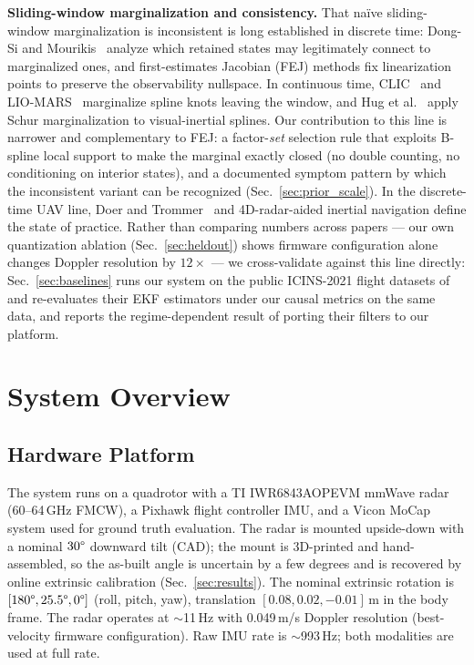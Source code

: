 \documentclass[conference]{IEEEtran}
\begin{document}
\textbf{Sliding-window marginalization and consistency.}
That na\"ive sliding-window marginalization is inconsistent is long
established in discrete time: Dong-Si and
Mourikis~\cite{dongsi2012consistency} analyze which retained states
may legitimately connect to marginalized ones, and first-estimates
Jacobian (FEJ) methods fix linearization points to preserve the
observability nullspace.  In continuous time,
CLIC~\cite{lv2023clic} and
LIO-MARS~\cite{quenzel2025liomars} marginalize spline knots leaving
the window, and Hug et al.~\cite{hug2022continuous} apply Schur
marginalization to visual-inertial splines.  Our contribution to this
line is narrower and complementary to FEJ: a factor-\emph{set}
selection rule that exploits B-spline local support to make the
marginal exactly closed (no double counting, no conditioning on
interior states), and a documented symptom pattern by which the
inconsistent variant can be recognized (Sec.~\ref{sec:prior_scale}).
In the discrete-time UAV line, Doer and
Trommer~\cite{doer2020ekf} and 4D-radar-aided inertial
navigation define the state of practice.
Rather than comparing numbers across papers --- our own quantization
ablation (Sec.~\ref{sec:heldout}) shows firmware configuration alone
changes Doppler resolution by $12\times$ --- we cross-validate against
this line directly: Sec.~\ref{sec:baselines} runs our system on the
public ICINS-2021 flight datasets of~\cite{doer2021yrio} and re-evaluates
their EKF estimators under our causal metrics on the same data, and
reports the regime-dependent result of porting their filters to our
platform.

\section{System Overview}
\label{sec:overview}

\subsection{Hardware Platform}
The system runs on a quadrotor with a TI IWR6843AOPEVM
mmWave radar (60--64\,GHz FMCW), a Pixhawk flight
controller IMU, and a Vicon MoCap system used for ground
truth evaluation.  The radar is mounted upside-down with a nominal
$30\degree$ downward tilt (CAD); the mount is 3D-printed and
hand-assembled, so the as-built angle is uncertain by a few degrees and
is recovered by online extrinsic calibration (Sec.~\ref{sec:results}).
The nominal extrinsic rotation is $[180\degree, 25.5\degree, 0\degree]$
(roll, pitch, yaw), translation $[0.08, 0.02, -0.01]$\,m in the body
frame.  The radar operates at $\sim$11\,Hz with 0.049\,m/s Doppler
resolution (best-velocity firmware configuration).  Raw IMU rate
is $\sim$993\,Hz; both modalities are used at full rate.
\end{document}
